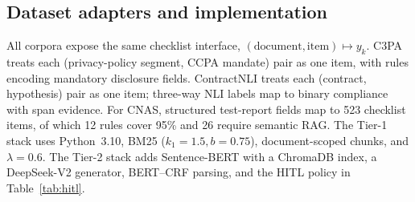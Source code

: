 \subsection{Dataset adapters and implementation}

All corpora expose the same checklist interface, $(\text{document},\text{item})\mapsto y_k$. C3PA \cite{c3pa2024} treats each (privacy-policy segment, CCPA mandate) pair as one item, with rules encoding mandatory disclosure fields. ContractNLI \cite{koreeda2021contractnli} treats each (contract, hypothesis) pair as one item; three-way NLI labels map to binary compliance with span evidence. For CNAS, structured test-report fields map to 523 checklist items, of which 12 rules cover 95\% and 26 require semantic RAG. The Tier-1 stack uses Python~3.10, BM25 ($k_1{=}1.5,b{=}0.75$), document-scoped chunks, and $\lambda{=}0.6$. The Tier-2 stack adds Sentence-BERT with a ChromaDB index, a DeepSeek-V2 generator, BERT--CRF parsing, and the HITL policy in Table~\ref{tab:hitl}.
